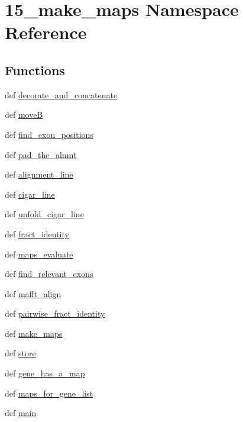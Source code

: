 \hypertarget{namespace15__make__maps}{\section{15\-\_\-make\-\_\-maps Namespace Reference}
\label{namespace15__make__maps}
}
\subsection*{Functions}
\begin{DoxyCompactItemize}
\item 
def \hyperlink{namespace15__make__maps_ae6500a084cdf7aeb8760901b5e80527f}{decorate\-\_\-and\-\_\-concatenate}
\item 
def \hyperlink{namespace15__make__maps_a27651959261a2cf4a720f2055c1c988c}{move\-B}
\item 
def \hyperlink{namespace15__make__maps_a733e865e96733cb32853e8e475c94ba7}{find\-\_\-exon\-\_\-positions}
\item 
def \hyperlink{namespace15__make__maps_aa49314ed5f097e10bc6b5f9188c6de65}{pad\-\_\-the\-\_\-alnmt}
\item 
def \hyperlink{namespace15__make__maps_adb034ea7830ef48016527ae3b77e60c9}{alignment\-\_\-line}
\item 
def \hyperlink{namespace15__make__maps_ab2a244438c38061f79733a614d59ab51}{cigar\-\_\-line}
\item 
def \hyperlink{namespace15__make__maps_a9c07fe73d306c8196f508aa372ed21fe}{unfold\-\_\-cigar\-\_\-line}
\item 
def \hyperlink{namespace15__make__maps_ab2b4ae0f4eff7d3660b39158c8036ef2}{fract\-\_\-identity}
\item 
def \hyperlink{namespace15__make__maps_a18e14c8a8e3a58db91ea6a11a8fe2eff}{maps\-\_\-evaluate}
\item 
def \hyperlink{namespace15__make__maps_aaed3e7e8a717419da1d45a96c40213c7}{find\-\_\-relevant\-\_\-exons}
\item 
def \hyperlink{namespace15__make__maps_ab43f04971ab4231381ca0124f7628038}{mafft\-\_\-align}
\item 
def \hyperlink{namespace15__make__maps_a01686cd68790602d7524611704136539}{pairwise\-\_\-fract\-\_\-identity}
\item 
def \hyperlink{namespace15__make__maps_a4bbda64e218f7b12fc0a4682f0328f94}{make\-\_\-maps}
\item 
def \hyperlink{namespace15__make__maps_a4c30e6b5fe6e67a7223d2d4d6be71e55}{store}
\item 
def \hyperlink{namespace15__make__maps_adeca02a3aa0b827d2407122765b1f031}{gene\-\_\-has\-\_\-a\-\_\-map}
\item 
def \hyperlink{namespace15__make__maps_a9af8fd5b4b5d0fdd666ff2309ea8faf2}{maps\-\_\-for\-\_\-gene\-\_\-list}
\item 
def \hyperlink{namespace15__make__maps_a51d056134f40eef11a89dbde93c799da}{main}
\end{DoxyCompactItemize}


